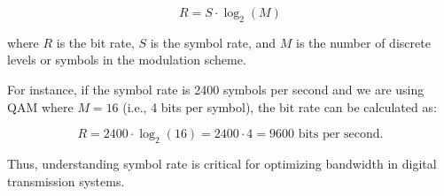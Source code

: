 \[
R = S \cdot \log_2(M)
\]

where \( R \) is the bit rate, \( S \) is the symbol rate, and \( M \) is the number of discrete levels or symbols in the modulation scheme.

For instance, if the symbol rate is 2400 symbols per second and we are using QAM where \( M = 16 \) (i.e., 4 bits per symbol), the bit rate can be calculated as:

\[
R = 2400 \cdot \log_2(16) = 2400 \cdot 4 = 9600 \text{ bits per second.}
\]

Thus, understanding symbol rate is critical for optimizing bandwidth in digital transmission systems.

